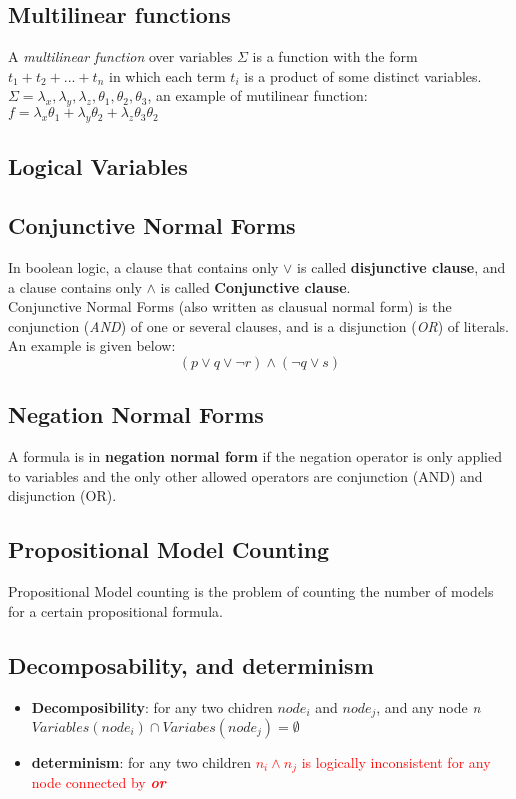    \subsection{Multi\-linear functions}
    A \textit{multi\-linear function} over variables $\Sigma$ is a function
    with the form $t_{1} + t_{2} + ... + t_{n}$ in which each term $t_{i}$ is a product of some distinct variables. \\
    $\Sigma = \lambda_{x}, \lambda_{y}, \lambda_{z}, \theta_{1}, \theta_{2}, \theta_{3}$, an example of muti\-linear function: $f = \lambda_{x}\theta_{1} + \lambda_{y}\theta_{2} + \lambda_{z}\theta_{3}\theta_{2}$
    \subsection{Logical Variables}
    \subsection{Conjunctive Normal Forms}
    In boolean logic, a clause that contains only $\vee$ is called \textbf{disjunctive clause}, and a clause contains only $\wedge$ is called \textbf{Conjunctive clause}.\\
    Conjunctive Normal Forms (also written as clausual normal form) is  the conjunction (\textit{AND}) of one or several clauses, and is a disjunction (\textit{OR}) of literals. An example is given below: $$(p \vee q \vee \neg r) \wedge (\neg q \vee s)$$
    \subsection{Negation Normal Forms}
    A formula is in \textbf{negation normal form} if the negation operator is only applied to variables and the only other allowed operators are conjunction (AND) and disjunction (OR).
    \subsection{Propositional Model Counting}
    Propositional Model counting is the problem of counting the number of models for a certain propositional formula.\cite{handbook-of-satisfiablity-model-counting}
    
    \subsection{Decomposability, and determinism}
    \begin{itemize}
        \item \textbf{Decomposibility}: for any two chidren $node_{i}$ and $node_{j}$, and any node \textit{n} $Variables(node_{i}) \cap Variabes(node_{j}) = \emptyset$
        \item \textbf{determinism}: for any two children \textcolor{red}{$n_{i} \wedge n_{j}$ is logically inconsistent for any node connected by \textbf{\textit{or}}}
    \end{itemize}
    